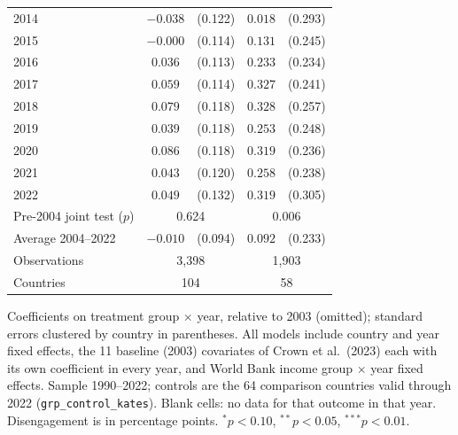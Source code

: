 \begin{table}[htbp]
\begin{tabular}{lcccc}
2014 & $-0.038$ & (0.122) & $0.018$ & (0.293) \\
2015 & $-0.000$ & (0.114) & $0.131$ & (0.245) \\
2016 & $0.036$ & (0.113) & $0.233$ & (0.234) \\
2017 & $0.059$ & (0.114) & $0.327$ & (0.241) \\
2018 & $0.079$ & (0.118) & $0.328$ & (0.257) \\
2019 & $0.039$ & (0.118) & $0.253$ & (0.248) \\
2020 & $0.086$ & (0.118) & $0.319$ & (0.236) \\
2021 & $0.043$ & (0.120) & $0.258$ & (0.238) \\
2022 & $0.049$ & (0.132) & $0.319$ & (0.305) \\
\midrule
Pre-2004 joint test ($p$) & \multicolumn{2}{c}{0.624} & \multicolumn{2}{c}{0.006} \\
Average 2004--2022 & $-0.010$ & (0.094) & $0.092$ & (0.233) \\
Observations & \multicolumn{2}{c}{3,398} & \multicolumn{2}{c}{1,903} \\
Countries & \multicolumn{2}{c}{104} & \multicolumn{2}{c}{58} \\
\bottomrule
\end{tabular}
\par\vspace{4pt}
\begin{minipage}{\textwidth}\footnotesize Coefficients on treatment group $\times$ year, relative to 2003 (omitted); standard errors clustered by country in parentheses. All models include country and year fixed effects, the 11 baseline (2003) covariates of Crown et al.\ (2023) each with its own coefficient in every year, and World Bank income group $\times$ year fixed effects. Sample 1990--2022; controls are the 64 comparison countries valid through 2022 (\texttt{grp\_control\_kates}). Blank cells: no data for that outcome in that year. Disengagement is in percentage points. $^{*}p<0.10$, $^{**}p<0.05$, $^{***}p<0.01$.\end{minipage}
\end{table}
